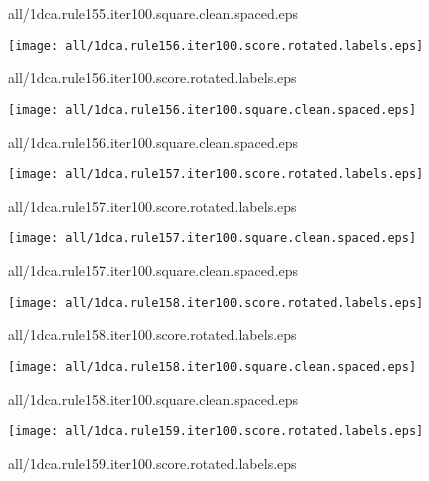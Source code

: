 \documentclass{article}
\begin{document}
{\footnotesize all/1dca.rule155.iter100.square.clean.spaced.eps}
\begin{center}
\begin{minipage}{\textwidth}
\texttt{[image: all/1dca.rule156.iter100.score.rotated.labels.eps]}
\end{minipage}
\end{center}
{\footnotesize all/1dca.rule156.iter100.score.rotated.labels.eps}
\begin{center}
\begin{minipage}{\textwidth}
\texttt{[image: all/1dca.rule156.iter100.square.clean.spaced.eps]}
\end{minipage}
\end{center}
{\footnotesize all/1dca.rule156.iter100.square.clean.spaced.eps}
\begin{center}
\begin{minipage}{\textwidth}
\texttt{[image: all/1dca.rule157.iter100.score.rotated.labels.eps]}
\end{minipage}
\end{center}
{\footnotesize all/1dca.rule157.iter100.score.rotated.labels.eps}
\begin{center}
\begin{minipage}{\textwidth}
\texttt{[image: all/1dca.rule157.iter100.square.clean.spaced.eps]}
\end{minipage}
\end{center}
{\footnotesize all/1dca.rule157.iter100.square.clean.spaced.eps}
\begin{center}
\begin{minipage}{\textwidth}
\texttt{[image: all/1dca.rule158.iter100.score.rotated.labels.eps]}
\end{minipage}
\end{center}
{\footnotesize all/1dca.rule158.iter100.score.rotated.labels.eps}
\begin{center}
\begin{minipage}{\textwidth}
\texttt{[image: all/1dca.rule158.iter100.square.clean.spaced.eps]}
\end{minipage}
\end{center}
{\footnotesize all/1dca.rule158.iter100.square.clean.spaced.eps}
\begin{center}
\begin{minipage}{\textwidth}
\texttt{[image: all/1dca.rule159.iter100.score.rotated.labels.eps]}
\end{minipage}
\end{center}
{\footnotesize all/1dca.rule159.iter100.score.rotated.labels.eps}
\end{document}

